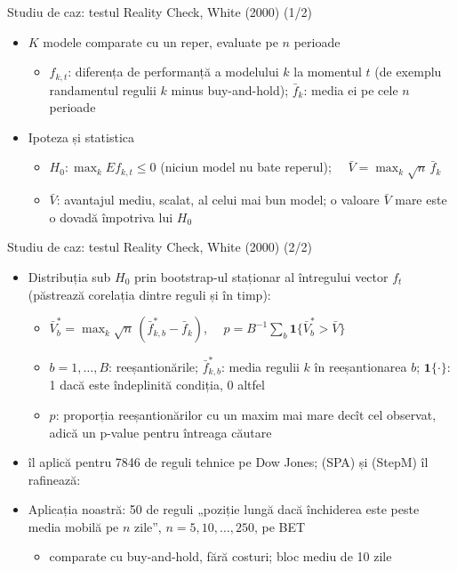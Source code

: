 \begin{frame}{Studiu de caz: testul Reality Check, White (2000) (1/2)}
\itemsize{\small}
\begin{itemize}
    \item $K$ modele comparate cu un reper, evaluate pe $n$ perioade 
    \begin{itemize}
        \item $f_{k,t}$: diferența de performanță a modelului $k$ la momentul $t$ (de exemplu randamentul regulii $k$ minus buy-and-hold); $\bar f_k$: media ei pe cele $n$ perioade
    \end{itemize}
    \item Ipoteza și statistica
    \begin{itemize}
        \item $H_0: \max_k E f_{k,t} \le 0$ (niciun model nu bate reperul); $\quad \bar V = \max_k \sqrt{n}\,\bar f_k$
        \item $\bar V$: avantajul mediu, scalat, al celui mai bun model; o valoare $\bar V$ mare este o dovadă împotriva lui $H_0$
    \end{itemize}
\end{itemize}
\end{frame}

\begin{frame}{Studiu de caz: testul Reality Check, White (2000) (2/2)}
\itemsize{\small}
\begin{itemize}
    \item Distribuția sub $H_0$ prin bootstrap-ul staționar al întregului vector $f_t$ (păstrează corelația dintre reguli și în timp):
    \begin{itemize}
        \item $\bar V^*_b = \max_k \sqrt{n}\,(\bar f^*_{k,b} - \bar f_k)$, $\quad p = B^{-1}\sum_b \mathbf{1}\{\bar V^*_b > \bar V\}$
        \item $b = 1, \dots, B$: reeșantionările; $\bar f^*_{k,b}$: media regulii $k$ în reeșantionarea $b$; $\mathbf{1}\{\cdot\}$: 1 dacă este îndeplinită condiția, 0 altfel
        \item $p$: proporția reeșantionărilor cu un maxim mai mare decît cel observat, adică un p-value pentru întreaga căutare
    \end{itemize}
    \item {} îl aplică pentru 7846 de reguli tehnice pe Dow Jones;  (SPA) și  (StepM) îl rafinează: 
    \item Aplicația noastră: 50 de reguli „poziție lungă dacă închiderea este peste media mobilă pe $n$ zile”, $n = 5, 10, \dots, 250$, pe BET
    \begin{itemize}
        \item comparate cu buy-and-hold, fără costuri; bloc mediu de 10 zile
    \end{itemize}
\end{itemize}
\end{frame}

